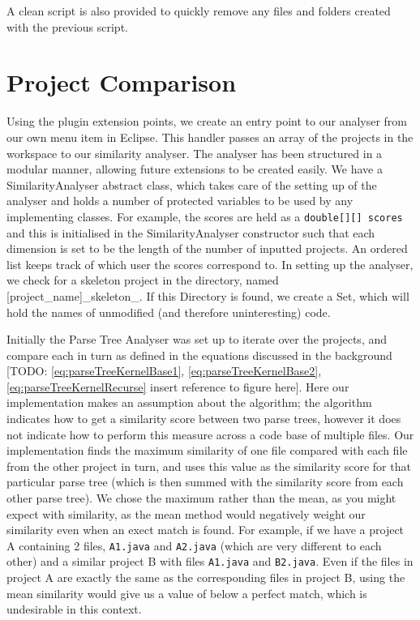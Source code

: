 A clean script is also provided to quickly remove any files and folders created with
the previous script.

\section{Project Comparison}

Using the plugin extension points,
we create an entry point to our analyser from our own menu item in Eclipse. This
handler passes an array of the projects in the workspace to our similarity analyser.
The analyser has been structured in a modular manner, allowing future extensions
to be created easily. We have a SimilarityAnalyser abstract class, which takes
care of the setting up of the analyser and holds a number of protected variables
to be used by any implementing classes. For example, the scores are held as a
\texttt{double[][] scores} and this is initialised in the SimilarityAnalyser
constructor such that each dimension is set to be the length of the number of
inputted projects. An ordered list keeps track of which user the scores correspond
to. In setting up the analyser, we check for a skeleton project in the directory,
named [project\_name]\_skeleton\_. If this Directory is found, we create a Set,
which will hold the names of unmodified (and therefore uninteresting) code.

Initially the Parse Tree Analyser was set up to iterate over the projects, and
compare each in turn as defined in the equations discussed in the background [TODO:
\cref{eq:parseTreeKernelBase1}, \cref{eq:parseTreeKernelBase2},
\cref{eq:parseTreeKernelRecurse}
insert reference to figure here]. Here our implementation makes an assumption about
the algorithm; the algorithm indicates how to get a similarity score between two 
parse trees, however it does not indicate how to perform this measure across a code
base of multiple files. Our implementation finds the maximum similarity of one file
compared with each file from the other project in turn, and uses this value as the
similarity score for that particular parse tree (which is then summed with the similarity
score from each other parse tree). We chose the maximum rather than the mean, as
you might expect with similarity, as the mean method would negatively weight our
similarity even when an exect match is found. For example, if we have a project A
containing 2 files, \texttt{A1.java} and \texttt{A2.java} (which are very different
to each other) and a similar project B with files \texttt{A1.java} and \texttt{B2.java}.
Even if the files in project A are exactly the same as the corresponding files in
project B, using the mean similarity would give us a value of below a perfect match,
which is undesirable in this context.

